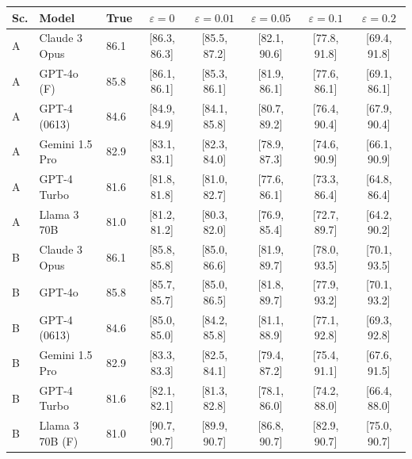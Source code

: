 \begin{tabular}{lllccccc}
\toprule
Sc. & Model & True & $\varepsilon=0$ & $\varepsilon=0.01$ & $\varepsilon=0.05$ & $\varepsilon=0.1$ & $\varepsilon=0.2$ \\
\midrule
A & Claude 3 Opus & 86.1 & [86.3, 86.3] & [85.5, 87.2] & [82.1, 90.6] & [77.8, 91.8] & [69.4, 91.8] \\
A & GPT-4o (F) & 85.8 & [86.1, 86.1] & [85.3, 86.1] & [81.9, 86.1] & [77.6, 86.1] & [69.1, 86.1] \\
A & GPT-4 (0613) & 84.6 & [84.9, 84.9] & [84.1, 85.8] & [80.7, 89.2] & [76.4, 90.4] & [67.9, 90.4] \\
A & Gemini 1.5 Pro & 82.9 & [83.1, 83.1] & [82.3, 84.0] & [78.9, 87.3] & [74.6, 90.9] & [66.1, 90.9] \\
A & GPT-4 Turbo & 81.6 & [81.8, 81.8] & [81.0, 82.7] & [77.6, 86.1] & [73.3, 86.4] & [64.8, 86.4] \\
A & Llama 3 70B & 81.0 & [81.2, 81.2] & [80.3, 82.0] & [76.9, 85.4] & [72.7, 89.7] & [64.2, 90.2] \\
\midrule
B & Claude 3 Opus & 86.1 & [85.8, 85.8] & [85.0, 86.6] & [81.9, 89.7] & [78.0, 93.5] & [70.1, 93.5] \\
B & GPT-4o & 85.8 & [85.7, 85.7] & [85.0, 86.5] & [81.8, 89.7] & [77.9, 93.2] & [70.1, 93.2] \\
B & GPT-4 (0613) & 84.6 & [85.0, 85.0] & [84.2, 85.8] & [81.1, 88.9] & [77.1, 92.8] & [69.3, 92.8] \\
B & Gemini 1.5 Pro & 82.9 & [83.3, 83.3] & [82.5, 84.1] & [79.4, 87.2] & [75.4, 91.1] & [67.6, 91.5] \\
B & GPT-4 Turbo & 81.6 & [82.1, 82.1] & [81.3, 82.8] & [78.1, 86.0] & [74.2, 88.0] & [66.4, 88.0] \\
B & Llama 3 70B (F) & 81.0 & [90.7, 90.7] & [89.9, 90.7] & [86.8, 90.7] & [82.9, 90.7] & [75.0, 90.7] \\
\bottomrule
\end{tabular}
